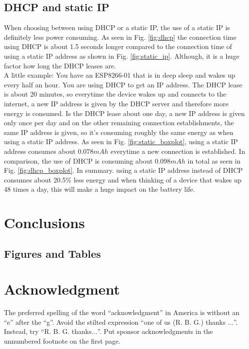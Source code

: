 \documentclass[conference]{IEEEtran}
\begin{document}
\subsection{DHCP and static IP}
When choosing between using DHCP or a static IP, the use of a static IP is definitely less power consuming. 
As seen in Fig. \ref{fig:dhcp} the connection time using DHCP is about 1.5 seconds longer compared to the connection time of using a static IP address as shown in Fig. \ref{fig:static_ip}.
Although, it is a huge factor how long the DHCP leases are.\\
A little example: You have an ESP8266-01 that is in deep sleep and wakes up every half an hour. You are using DHCP to get an IP address. 
The DHCP lease is about 20 minutes, so everytime the device wakes up and connects to the internet, a new IP address is given by the DHCP server and therefore more energy is consumed.
Is the DHCP lease about one day, a new IP address is given only once per day and on the other remaining connection establishments, the same IP address is given, so it's consuming roughly the same energy as when using a static IP address.
As seen in Fig. \ref{fig:static_boxplot}, using a static IP address consumes about 0.078$mAh$ everytime a new connection is established.
In comparison, the use of DHCP is consuming about 0.098$mAh$ in total as seen in Fig. \ref{fig:dhcp_boxplot}.
In summary. using a static IP address instead of DHCP consumes about 20.5\% less energy and when thinking of a device that wakes up 48 times a day, this will make a huge impact on the battery life.




\section{Conclusions}

\subsection{Figures and Tables}

\section*{Acknowledgment}

The preferred spelling of the word ``acknowledgment'' in America is without 
an ``e'' after the ``g''. Avoid the stilted expression ``one of us (R. B. 
G.) thanks $\ldots$''. Instead, try ``R. B. G. thanks$\ldots$''. Put sponsor 
acknowledgments in the unnumbered footnote on the first page.


\printbibliography
\end{document}
